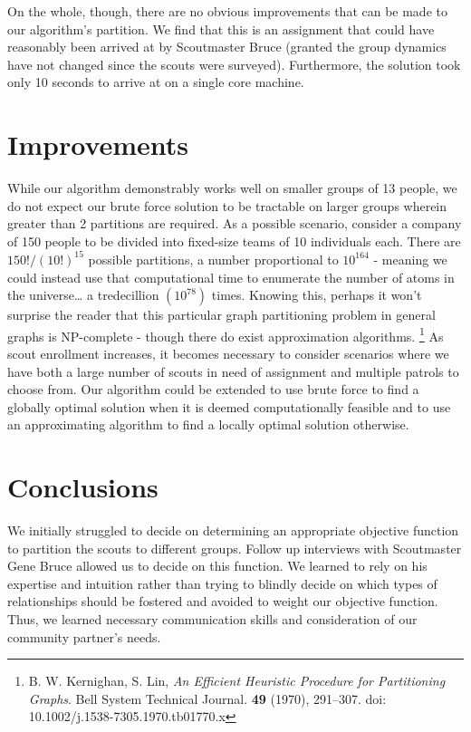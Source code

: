\documentclass{amsart}
\theoremstyle{definition}
\theoremstyle{remark}
\numberwithin{equation}{section}
\begin{document}
On the whole, though, there are no obvious improvements that can be made to our algorithm's partition. We find that this is an assignment that could have reasonably been arrived at by Scoutmaster Bruce (granted the group dynamics have not changed since the scouts were surveyed).  Furthermore, the solution took only 10 seconds to arrive at on a single core machine.

\section*{Improvements}
While our algorithm demonstrably works well on smaller groups of 13 people, we do not expect our brute force solution to be tractable on larger groups wherein greater than 2 partitions are required. As a possible scenario, consider a company of 150 people to be divided into fixed-size teams of 10 individuals each. There are $150! / (10!)^{15}$ possible partitions, a number proportional to $10^{164}$ - meaning we could instead use that computational time to enumerate the number of atoms in the universe… a tredecillion $(10^{78})$ times. Knowing this, perhaps it won’t surprise the reader that this particular graph partitioning problem in general graphs is NP-complete - though there do exist approximation algorithms.%
\footnote{B. W. Kernighan, S. Lin, \textit{An Efficient Heuristic Procedure for Partitioning Graphs}. Bell System Technical Journal. \textbf{49} (1970), 291--307. doi: 10.1002/j.1538-7305.1970.tb01770.x}%
As scout enrollment increases, it becomes necessary to consider scenarios where we have both a large number of scouts in need of assignment and multiple patrols to choose from. Our algorithm could be extended to use brute force to find a globally optimal solution when it is deemed computationally feasible and to use an approximating algorithm to find a locally optimal solution otherwise. 

\section*{Conclusions}
We initially struggled to decide on determining an appropriate objective function to partition the scouts to different groups. Follow up interviews with Scoutmaster Gene Bruce allowed us to decide on this function. We learned to rely on his expertise and intuition rather than trying to blindly decide on which types of relationships should be fostered and avoided to weight our objective function. Thus, we learned necessary communication skills and consideration of our community partner's needs.
\end{document}
